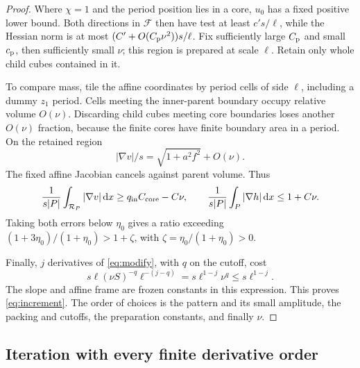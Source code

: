 \begin{proof}
Where \(\chi=1\) and the period position lies in a core, \(u_0\)
has a fixed positive lower bound. Both directions in \(\mathcal F\)
then have test at least \(c's/\ell\), while the Hessian norm is at most
\((C'+O(C_{\rm p}\nu^2))s/\ell\). Fix sufficiently large
\(C_{\rm p}\) and small \(c_{\rm p}\), then sufficiently small \(\nu\);
this region is prepared at scale \(\ell\).
Retain only whole child cubes contained in it.

To compare mass, tile the affine coordinates by period cells of
side \(\ell\), including a dummy \(z_1\) period. Cells meeting the
inner-parent boundary occupy relative volume \(O(\nu)\).
Discarding child cubes meeting core boundaries loses another
\(O(\nu)\) fraction, because the finite cores have finite boundary
area in a period. On the retained region
\[
 |\nabla v|/s=\sqrt{1+a^2f^2}+O(\nu).
\]
The fixed affine Jacobian cancels against parent volume. Thus
\[
 \frac1{s|P|}\int_{\mathcal R_P}|\nabla v|\,\mathrm d x
 \ge q_{\rm in}C_{\rm core}-C\nu,\qquad
 \frac1{s|P|}\int_P|\nabla h|\,\mathrm d x\le1+C\nu.
\]
Taking both errors below \(\eta_0\) gives a ratio exceeding
\((1+3\eta_0)/(1+\eta_0)>1+\zeta\), with
\(\zeta=\eta_0/(1+\eta_0)>0\).

Finally, \(j\) derivatives of \eqref{eq:modify}, with \(q\) on the
cutoff, cost
\[
 s\ell(\nu S)^{-q}\ell^{-(j-q)}
   =s\ell^{1-j}\nu^q\le s\ell^{1-j}.
\]
The slope and affine frame are frozen constants in this expression.
This proves \eqref{eq:increment}. The order of choices is the
pattern and its small amplitude, the packing and cutoffs,
the preparation constants, and finally \(\nu\).
\end{proof}

\subsection{Iteration with every finite derivative order}

